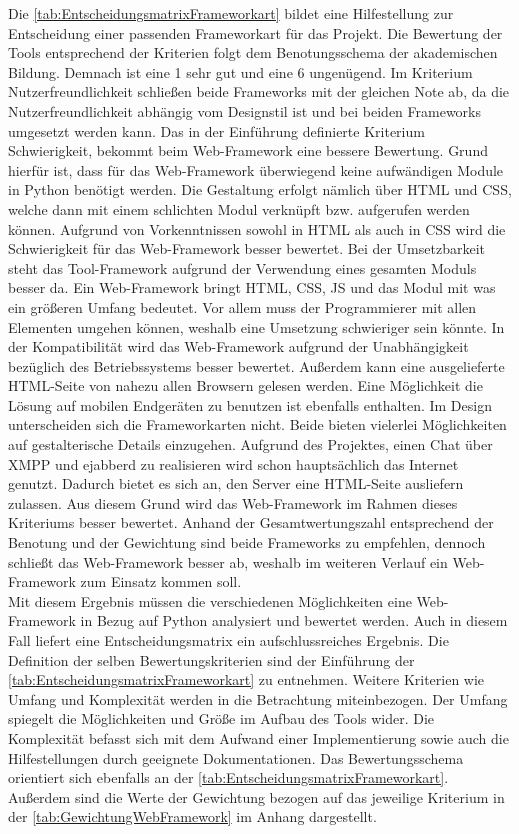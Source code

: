 \documentclass[a4paper,titlepage,halfparskip,12pt]{scrreprt}
\begin{document}
\begin{onehalfspacing}
Die \autoref{tab:EntscheidungsmatrixFrameworkart} bildet eine Hilfestellung zur Entscheidung einer passenden Frameworkart für das Projekt. Die Bewertung der Tools entsprechend der Kriterien folgt dem Benotungsschema der akademischen Bildung. Demnach ist eine 1 sehr gut und eine 6 ungenügend. Im Kriterium Nutzerfreundlichkeit schließen beide Frameworks mit der gleichen Note ab, da die Nutzerfreundlichkeit abhängig vom Designstil ist und bei beiden Frameworks umgesetzt werden kann. Das in der Einführung definierte Kriterium \glqq Schwierigkeit\grqq, bekommt beim Web-Framework eine bessere Bewertung. Grund hierfür ist, dass für das Web-Framework überwiegend keine aufwändigen Module in Python benötigt werden. Die Gestaltung erfolgt nämlich über \ac{HTML} und \ac{CSS}, welche dann mit einem schlichten Modul verknüpft bzw. aufgerufen werden können. Aufgrund von Vorkenntnissen sowohl in \ac{HTML} als auch in \ac{CSS} wird die Schwierigkeit für das Web-Framework besser bewertet. Bei der Umsetzbarkeit steht das Tool-Framework aufgrund der Verwendung eines gesamten Moduls besser da. Ein Web-Framework bringt \ac{HTML}, \ac{CSS}, \ac{JS} und das Modul mit was ein größeren Umfang bedeutet. Vor allem muss der Programmierer mit allen Elementen umgehen können, weshalb eine Umsetzung schwieriger sein könnte. In der Kompatibilität wird das Web-Framework aufgrund der Unabhängigkeit bezüglich des Betriebssystems besser bewertet. Außerdem kann eine ausgelieferte \ac{HTML}-Seite von nahezu allen Browsern gelesen werden. Eine Möglichkeit die Lösung auf mobilen Endgeräten zu benutzen ist ebenfalls enthalten. Im Design unterscheiden sich die Frameworkarten nicht. Beide bieten vielerlei Möglichkeiten auf gestalterische Details einzugehen. Aufgrund des Projektes, einen Chat über \ac{XMPP} und ejabberd zu realisieren wird schon hauptsächlich das Internet genutzt. Dadurch bietet es sich an, den Server eine \ac{HTML}-Seite ausliefern zulassen. Aus diesem Grund wird das Web-Framework im Rahmen dieses Kriteriums besser bewertet. Anhand der Gesamtwertungszahl entsprechend der Benotung und der Gewichtung sind beide Frameworks zu empfehlen, dennoch schließt das Web-Framework besser ab, weshalb im weiteren Verlauf ein Web-Framework zum Einsatz kommen soll. \cite{FrameworkOverview} \cite{WebFramework}\\ 
Mit diesem Ergebnis müssen die verschiedenen Möglichkeiten eine Web-Framework in Bezug auf Python analysiert und bewertet werden. Auch in diesem Fall liefert eine Entscheidungsmatrix ein aufschlussreiches Ergebnis. Die Definition der selben Bewertungskriterien sind der Einführung der \autoref{tab:EntscheidungsmatrixFrameworkart} zu entnehmen. Weitere Kriterien wie Umfang und Komplexität werden in die Betrachtung miteinbezogen. Der Umfang spiegelt die Möglichkeiten und Größe im Aufbau des Tools wider. Die Komplexität befasst sich mit dem Aufwand einer Implementierung sowie auch die Hilfestellungen durch geeignete Dokumentationen. Das Bewertungsschema orientiert sich ebenfalls an der \autoref{tab:EntscheidungsmatrixFrameworkart}. Außerdem sind die Werte der Gewichtung bezogen auf das jeweilige Kriterium in der \autoref{tab:GewichtungWebFramework} im Anhang dargestellt.

\end{onehalfspacing}
\end{document}
